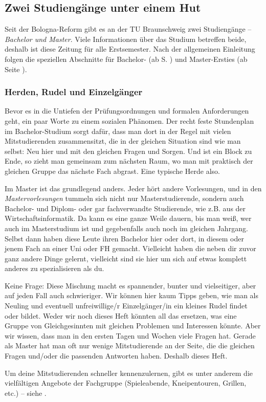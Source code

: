 
\subsection{Zwei Studiengänge unter einem Hut}
	Seit der Bologna-Reform gibt es an der TU Braunschweig zwei Studiengänge -- \textit{Bachelor und Master}. Viele Informationen über das Studium betreffen beide, deshalb ist diese Zeitung für alle Erstsemester. Nach der allgemeinen Einleitung folgen die speziellen Abschnitte für Bachelor- (ab S. \pageref{bachelor}) und Master-Ersties (ab Seite \pageref{master}).

\subsubsection{Herden, Rudel und Einzelgänger}
	Bevor es in die Untiefen der Prüfungsordnungen und formalen Anforderungen geht, ein paar Worte zu einem sozialen Phänomen. Der recht feste Stundenplan im Bachelor-Studium sorgt dafür, dass man dort in der Regel mit vielen Mitstudierenden zusammensitzt, die in der gleichen Situation sind wie man selbst: Neu hier und mit den gleichen Fragen und Sorgen. Und ist ein Block zu Ende, so zieht man gemeinsam zum nächsten Raum, wo man mit praktisch der gleichen Gruppe das nächste Fach abgrast. Eine typische Herde also.

	Im Master ist das grundlegend anders. Jeder hört andere Vorlesungen, und in den \emph{Mastervorlesungen} tummeln sich nicht nur Masterstudierende, sondern auch Bachelor- und Diplom- oder gar fachverwandte Studierende, wie z.B. aus der Wirtschaftsinformatik. Da kann es eine ganze Weile dauern, bis man weiß, wer auch im Masterstudium ist und gegebenfalls auch noch im gleichen Jahrgang. Selbst dann haben diese Leute ihren Bachelor hier oder dort, in diesem oder jenem Fach an einer Uni oder FH gemacht. Vielleicht haben die neben dir zuvor ganz andere Dinge gelernt, vielleicht sind sie hier um sich auf etwas komplett anderes zu spezialisieren als du.

	Keine Frage: Diese Mischung macht es spannender, bunter und vielseitiger, aber auf jeden Fall auch schwieriger. Wir können hier kaum Tipps geben, wie man als Neuling und eventuell unfreiwillige/r Einzelgänger/in ein kleines Rudel findet oder bildet. Weder wir noch dieses Heft könnten all das ersetzen, was eine Gruppe von Gleichgesinnten mit gleichen Problemen und Interessen könnte. Aber wir wissen, dass man in den ersten Tagen und Wochen viele Fragen hat. Gerade als Master hat man oft nur wenige Mitstudierende an der Seite, die die gleichen Fragen und/oder die passenden Antworten haben. Deshalb dieses Heft.

	Um deine Mitstudierenden schneller kennenzulernen, gibt es unter anderem die vielfältigen Angebote der Fachgruppe (Spieleabende, Kneipentouren, Grillen, etc.) -- siehe \fginfoUrl.
